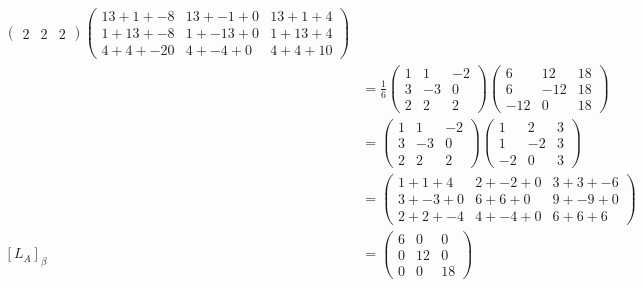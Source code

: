 \documentclass[13pt]{article}
\begin{document}
\begin{enumerate}[label=(\alph*),leftmargin=*]
\begin{align*}
\begin{pmatrix}
                    2 & 2 & 2
                  \end{pmatrix}
                  \begin{pmatrix}
                    13 + 1 + -8 & 13 + -1 + 0 & 13 + 1 + 4 \\
                    1 + 13 + -8 & 1 + -13 + 0 & 1 + 13 + 4 \\
                    4 + 4 + -20 & 4 + -4 + 0 & 4 + 4 + 10
                  \end{pmatrix} \\
                &= \frac{1}{6}
                  \begin{pmatrix}
                    1 & 1 & -2 \\
                    3 & -3 & 0 \\
                    2 & 2 & 2
                  \end{pmatrix}
                  \begin{pmatrix}
                    6 & 12 & 18 \\
                    6 & -12 & 18 \\
                    -12 & 0 & 18
                  \end{pmatrix} \\
                &= 
                  \begin{pmatrix}
                    1 & 1 & -2 \\
                    3 & -3 & 0 \\
                    2 & 2 & 2
                  \end{pmatrix}
                  \begin{pmatrix}
                    1 & 2 & 3 \\
                    1 & -2 & 3 \\
                    -2 & 0 & 3
                  \end{pmatrix} \\
                &=
                  \begin{pmatrix}
                    1 + 1 + 4 & 2 + -2 + 0 & 3 + 3 + -6 \\
                    3 + -3 + 0 & 6 + 6 + 0 & 9 + -9 + 0 \\
                    2 + 2 + -4 & 4 + -4 + 0 & 6 + 6 + 6
                  \end{pmatrix} \\
    [L_A]_\beta &=
                  \begin{pmatrix}
                    6 & 0 & 0 \\
                    0 & 12 & 0 \\
                    0 & 0 & 18
                  \end{pmatrix}
  \end{align*}
\end{enumerate}
\end{document}
